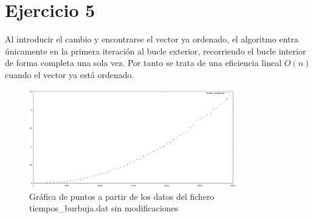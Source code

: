 \documentclass[paper=a4, fontsize=10pt]{scrartcl} %
\begin{document}
\section{Ejercicio 5}

Al introducir el cambio y encontrarse el vector ya ordenado, el algoritmo entra únicamente en la primera iteración al bucle exterior, recorriendo el bucle interior de forma completa una sola vez. Por tanto se trata de una eficiencia lineal $O(n)$ cuando el vector ya está ordenado.

\begin{figure}[H] %
	\centering
	\label{lsblk}
	\includegraphics[width=0.8\textwidth]{../imgs/c1.PNG}
	\caption{Gráfica de puntos a partir de los datos del fichero tiempos\_burbuja.dat sin modificaciones} 
\end{figure}


\end{document}
